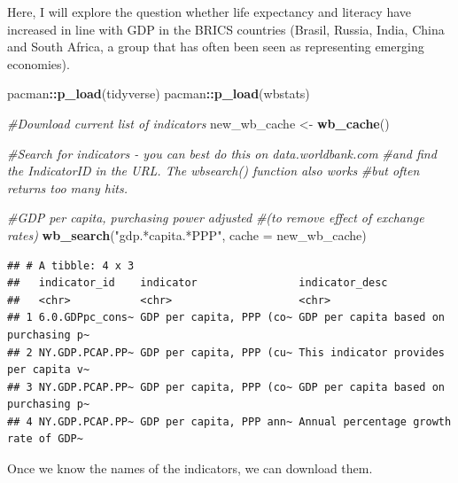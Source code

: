 \documentclass[
]{book}
\newenvironment{Shaded}{\begin{snugshade}}{\end{snugshade}}
\newcommand{\CommentTok}[1]{\textcolor[rgb]{0.56,0.35,0.01}{\textit{#1}}}
\newcommand{\DataTypeTok}[1]{\textcolor[rgb]{0.13,0.29,0.53}{#1}}
\newcommand{\KeywordTok}[1]{\textcolor[rgb]{0.13,0.29,0.53}{\textbf{#1}}}
\newcommand{\NormalTok}[1]{#1}
\newcommand{\OperatorTok}[1]{\textcolor[rgb]{0.81,0.36,0.00}{\textbf{#1}}}
\newcommand{\StringTok}[1]{\textcolor[rgb]{0.31,0.60,0.02}{#1}}
\begin{document}
Here, I will explore the question whether life expectancy and literacy have increased in line with GDP in the BRICS countries (Brasil, Russia, India, China and South Africa, a group that has often been seen as representing emerging economies).

\begin{Shaded}
\begin{Highlighting}[]
\NormalTok{pacman}\OperatorTok{::}\KeywordTok{p_load}\NormalTok{(tidyverse)}
\NormalTok{pacman}\OperatorTok{::}\KeywordTok{p_load}\NormalTok{(wbstats)}
\end{Highlighting}
\end{Shaded}

\begin{Shaded}
\begin{Highlighting}[]
\CommentTok{#Download current list of indicators}
\NormalTok{new_wb_cache <-}\StringTok{ }\KeywordTok{wb_cache}\NormalTok{()}

\CommentTok{#Search for indicators - you can best do this on data.worldbank.com }
\CommentTok{#and find the IndicatorID in the URL. The wbsearch() function also works}
\CommentTok{#but often returns too many hits.}

\CommentTok{#GDP per capita, purchasing power adjusted }
\CommentTok{#(to remove effect of exchange rates)}
\KeywordTok{wb_search}\NormalTok{(}\StringTok{"gdp.*capita.*PPP"}\NormalTok{, }\DataTypeTok{cache =}\NormalTok{ new_wb_cache)}
\end{Highlighting}
\end{Shaded}

\begin{verbatim}
## # A tibble: 4 x 3
##   indicator_id    indicator                indicator_desc                       
##   <chr>           <chr>                    <chr>                                
## 1 6.0.GDPpc_cons~ GDP per capita, PPP (co~ GDP per capita based on purchasing p~
## 2 NY.GDP.PCAP.PP~ GDP per capita, PPP (cu~ This indicator provides per capita v~
## 3 NY.GDP.PCAP.PP~ GDP per capita, PPP (co~ GDP per capita based on purchasing p~
## 4 NY.GDP.PCAP.PP~ GDP per capita, PPP ann~ Annual percentage growth rate of GDP~
\end{verbatim}

Once we know the names of the indicators, we can download them.
\end{document}
